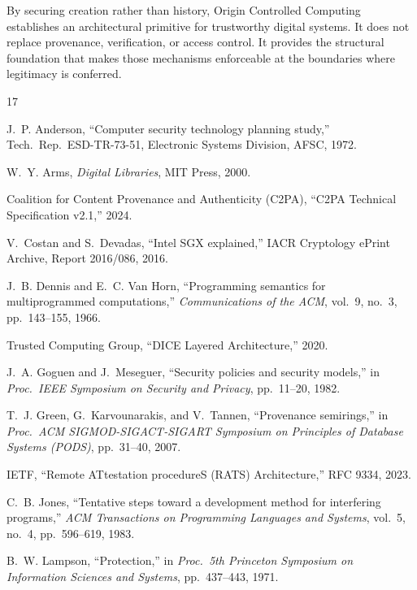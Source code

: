 \documentclass[11pt,letterpaper]{article}
\theoremstyle{occplain}
\theoremstyle{occremark}
\begin{document}
By securing creation rather than history, Origin Controlled Computing establishes an architectural primitive for trustworthy digital systems. It does not replace provenance, verification, or access control. It provides the structural foundation that makes those mechanisms enforceable at the boundaries where legitimacy is conferred.


\begin{thebibliography}{17}

J.~P. Anderson,
``Computer security technology planning study,''
Tech.\ Rep.\ ESD-TR-73-51, Electronic Systems Division, AFSC, 1972.

W.~Y. Arms,
\emph{Digital Libraries},
MIT Press, 2000.

Coalition for Content Provenance and Authenticity (C2PA),
``C2PA Technical Specification v2.1,'' 2024.

V.~Costan and S.~Devadas,
``Intel SGX explained,''
IACR Cryptology ePrint Archive, Report 2016/086, 2016.

J.~B. Dennis and E.~C. Van Horn,
``Programming semantics for multiprogrammed computations,''
\emph{Communications of the ACM}, vol.~9, no.~3, pp.~143--155, 1966.

Trusted Computing Group,
``DICE Layered Architecture,'' 2020.

J.~A. Goguen and J.~Meseguer,
``Security policies and security models,''
in \emph{Proc.\ IEEE Symposium on Security and Privacy}, pp.~11--20, 1982.

T.~J. Green, G.~Karvounarakis, and V.~Tannen,
``Provenance semirings,''
in \emph{Proc.\ ACM SIGMOD-SIGACT-SIGART Symposium on Principles of Database Systems (PODS)}, pp.~31--40, 2007.

IETF,
``Remote ATtestation procedureS (RATS) Architecture,''
RFC 9334, 2023.

C.~B. Jones,
``Tentative steps toward a development method for interfering programs,''
\emph{ACM Transactions on Programming Languages and Systems}, vol.~5, no.~4, pp.~596--619, 1983.

B.~W. Lampson,
``Protection,''
in \emph{Proc.\ 5th Princeton Symposium on Information Sciences and Systems}, pp.~437--443, 1971.


\end{thebibliography}
\end{document}
